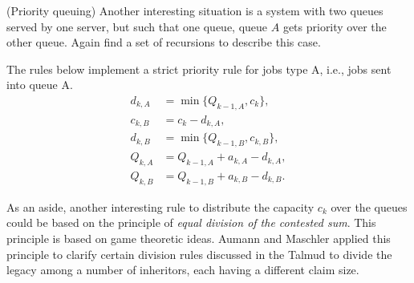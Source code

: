   \begin{exercise} (Priority queuing) Another interesting situation is
    a system with two queues served by one server, but such that one
    queue, queue $A$ gets priority over the other
    queue. Again find a set of recursions to describe this case.
    \begin{solution}
      The rules below implement a strict priority rule for jobs type
      A, i.e., jobs sent into queue A.
\begin{equation*}
  \begin{split}
    d_{k,A} &= \min\{Q_{k-1, A}, c_k\}, \\
    c_{k,B} &= c_k - d_{k,A}, \\
    d_{k,B} &= \min\{Q_{k-1, B}, c_{k,B}\}, \\
    Q_{k,A} &= Q_{k-1, A} + a_{k,A} - d_{k,A}, \\
    Q_{k,B} &= Q_{k-1, B} + a_{k,B} - d_{k,B}.
  \end{split}
\end{equation*}

As an aside, another interesting rule to distribute the capacity $c_k$
over the queues could be based on the principle of \textit{ equal
  division of the contested sum}. This principle is based on game
theoretic ideas. Aumann and Maschler applied this principle to clarify
certain division rules discussed in the Talmud to divide the legacy
among a number of inheritors, each having a different claim size.
    \end{solution}
\end{exercise}



